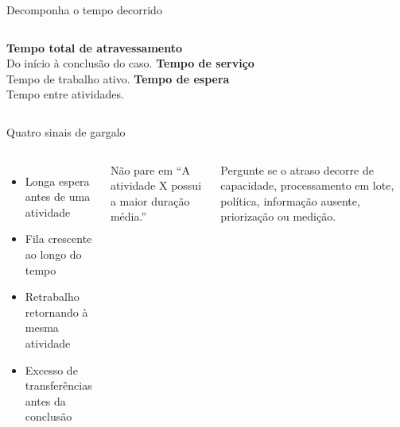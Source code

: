 \documentclass[aspectratio=169,11pt]{beamer}
\begin{document}
\begin{frame}{Decomponha o tempo decorrido}
  \centering
  \vspace{0.55cm}
  \begin{columns}[T,onlytextwidth]
    \textbf{Tempo total de atravessamento}\\Do início à conclusão do caso.
    \textbf{Tempo de serviço}\\Tempo de trabalho ativo.
    \textbf{Tempo de espera}\\Tempo entre atividades.
  \end{columns}
\end{frame}

\begin{frame}{Quatro sinais de gargalo}
  \begin{columns}[T,onlytextwidth]
      \begin{itemize}
        \item Longa espera antes de uma atividade
        \item Fila crescente ao longo do tempo
        \item Retrabalho retornando à mesma atividade
        \item Excesso de transferências antes da conclusão
      \end{itemize}
      \begin{block}{Não pare em}
        ``A atividade X possui a maior duração média.''
      \end{block}
      Pergunte se o atraso decorre de capacidade, processamento em lote, política, informação ausente, priorização ou medição.
  \end{columns}
\end{frame}
\end{document}

